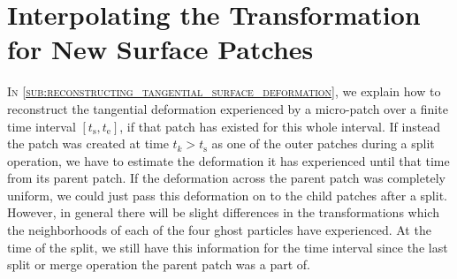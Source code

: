 \chapter{Interpolating the Transformation for New Surface Patches} %
\label{sec:transform_interpolation}
%
\vspace{-\baselineskip}\lettrine[lhang=0.06, loversize=-0.015,
findent=-1pt]{I}{n \cref{sub:reconstructing_tangential_surface_deformation}}, we
explain how to reconstruct the tangential deformation experienced by a
micro-patch over a finite time interval $[t_\mathrm{s}, t_\mathrm{e}]$, if that
patch has existed for this whole interval.
%
If instead the patch was created at time $t_k > t_\mathrm{s}$ as one of the
outer patches during a split operation, we have to estimate the deformation it
has experienced until that time from its parent patch.
%
If the deformation across the parent patch was completely uniform, we could just
pass this deformation on to the child patches after a split.
%
However, in general there will be slight differences in the transformations
which the neighborhoods of each of the four ghost particles have experienced.
%
At the time of the split, we still have this information for the time interval
since the last split or merge operation the parent patch was a part of.
%


